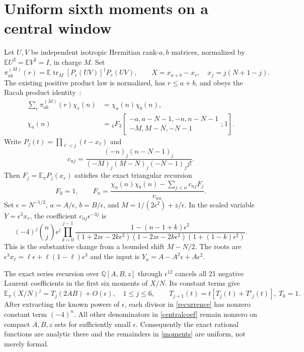 \documentclass[11pt,a4paper]{article}
\newcommand{\EE}{\mathbb E}
\newcommand{\tr}{\operatorname{tr}}
\begin{document}
\section{Uniform sixth moments on a central window}
Let $U,V$ be independent isotropic Hermitian rank-$a,b$ matrices,
normalized by $\EE U^2=\EE V^2=I$, in charge $M$. Set
\begin{equation}
 \pi^{(M)}_{ab}(r)=\EE\tr_M[P_r(UV)]^\dagger P_r(UV),\qquad
 X=x_{a+b}-x_r,\quad x_j=j(N+1-j).
\end{equation}
The existing positive product law is normalized, has $r\le a+b$,
and obeys the Racah product identity~\cite{local}:
\begin{align}
 \sum_r\pi^{(M)}_{ab}(r)\chi_r(n)&=\chi_a(n)\chi_b(n),\\
 \chi_a(n)&={}_4F_3\!\left[\begin{matrix}-a,a-N-1,-n,n-N-1\\
                 -M,M-N,-N-1\end{matrix};1\right].
\end{align}
Write $P_j(t)=\prod_{\ell<j}(t-x_\ell)$ and
\begin{equation}
 c_{nj}=\frac{(-n)_j(n-N-1)_j}
 {(-M)_j(M-N)_j(-N-1)_j j!}.
\end{equation}
Then $F_j=\EE_\pi P_j(x_r)$ satisfies the exact triangular recursion
\begin{equation}
 F_0=1,\qquad
 F_n=\frac{\chi_a(n)\chi_b(n)-\sum_{j<n}c_{nj}F_j}{c_{nn}}.
 \label{recurrence}
\end{equation}
Set $\epsilon=N^{-1/2}$, $a=A/\epsilon$, $b=B/\epsilon$,
and $M=1/(2\epsilon^2)+z/\epsilon$. In the scaled variable
$Y=\epsilon^3x_r$, the coefficient $c_{nj}\epsilon^{-3j}$ is
\begin{equation}
 (-4)^j\binom nj\epsilon^j
 \prod_{k=0}^{j-1}
 \frac{1-(n-1+k)\epsilon^2}
 {(1+2z\epsilon-2k\epsilon^2)
  (1-2z\epsilon-2k\epsilon^2)(1+(1-k)\epsilon^2)}.
 \label{centralcoef}
\end{equation}
This is the substantive change from a bounded shift $M-N/2$.
The roots are $\epsilon^3x_\ell=\ell\epsilon+
\ell(1-\ell)\epsilon^3$ and the input is
$Y_a=A-A^2\epsilon+A\epsilon^2$.

The exact series recursion over $\mathbb Q[A,B,z]$ through
$\epsilon^{12}$ cancels all 21 negative Laurent coefficients in
the first six moments of $X/N$. Its constant terms give
\begin{equation}
 \EE_\pi(X/N)^j=T_j(2AB)+O(\epsilon),\quad 1\le j\le6,
 \qquad T_{j+1}(t)=t[T_j(t)+T'_j(t)],\ T_0=1.\label{moments}
\end{equation}
After extracting the known powers of $\epsilon$, each divisor in
\eqref{recurrence} has nonzero constant term $(-4)^n$.
All other denominators in \eqref{centralcoef} remain nonzero on
compact $A,B,z$ sets for sufficiently small $\epsilon$.
Consequently the exact rational functions are analytic there and
the remainders in \eqref{moments} are uniform, not merely formal.
\end{document}
